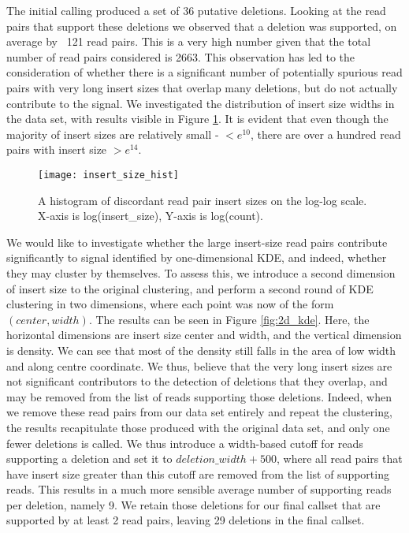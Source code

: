 The initial calling produced a set of 36 putative deletions. Looking at the read pairs that support these deletions we observed that a deletion was supported, on average by ~121 read pairs. This is a very high number given that the total number of read pairs considered is 2663. This observation has led to the consideration of whether there is a significant number of potentially spurious read pairs with very long insert sizes that overlap many deletions, but do not actually contribute to the signal. We investigated the distribution of insert size widths in the data set, with results visible in Figure \ref{fig:insert_size_hist}. It is evident that even though the majority of insert sizes are relatively small - $< e^{10}$, there are over a hundred read pairs with insert size $> e^{14}$.

\begin{figure}[H]
    \texttt{[image: insert\_size\_hist]}
    \centering
    \caption {A histogram of discordant read pair insert sizes on the log-log scale. X-axis is log(insert\_size), Y-axis is log(count).}
    \label{fig:insert_size_hist}
\end{figure}

We would like to investigate whether the large insert-size read pairs contribute significantly to signal identified by one-dimensional KDE, and indeed, whether they may cluster by themselves. To assess this, we introduce a second dimension of insert size to the original clustering, and perform a second round of KDE clustering in two dimensions, where each point was now of the form $(center, width)$. The results can be seen in Figure \ref{fig:2d_kde}. Here, the horizontal dimensions are insert size center and width, and the vertical dimension is density. We can see that most of the density still falls in the area of low width and along centre coordinate. We thus, believe that the very long insert sizes are not significant contributors to the detection of deletions that they overlap, and may be removed from the list of reads supporting those deletions. Indeed, when we remove these read pairs from our data set entirely and repeat the clustering, the results recapitulate those produced with the original data set, and only one fewer deletions is called. We thus introduce a width-based cutoff for reads supporting a deletion and set it to $deletion\_width + 500$, where all read pairs that have insert size greater than this cutoff are removed from the list of supporting reads. This results in a much more sensible average number of supporting reads per deletion, namely 9. We retain those deletions for our final callset that are supported by at least 2 read pairs, leaving 29 deletions in the final callset.

